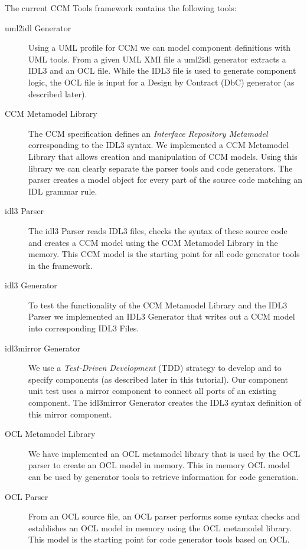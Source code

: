 The current CCM Tools framework contains the following tools:
\begin{description}
\item [uml2idl Generator]
Using a UML profile for CCM \cite{} we can model component definitions with
UML tools. From a given UML XMI file a uml2idl generator extracts a IDL3 
and an OCL file. 
While the IDL3 file is used to generate component logic, the OCL file is input
for a Design by Contract (DbC) generator (as described later).

\item [CCM Metamodel Library]
The CCM specification defines an {\it Interface Repository Metamodel} corresponding
to the IDL3 syntax. We implemented a CCM Metamodel Library that allows creation and
manipulation of CCM models. Using this library we can clearly separate the parser
tools and code generators. The parser creates a model object for every part of the
source code matching an IDL grammar rule.

\item [idl3 Parser]
The idl3 Parser reads IDL3 files, checks the syntax of these source code
and creates a CCM model using the CCM Metamodel Library in the memory. This CCM
model is the starting point for all code generator tools in the framework.

\item [idl3 Generator]
To test the functionality of the CCM Metamodel Library and the IDL3 Parser we implemented
an IDL3 Generator that writes out a CCM model into corresponding IDL3 Files.

\item [idl3mirror Generator]
We use a {\it Test-Driven Development} (TDD) strategy to develop and to specify
components (as described later in this tutorial). Our component unit test uses a
mirror component to connect all ports of an existing component. The idl3mirror
Generator creates the IDL3 syntax definition of this mirror component.


\item [OCL Metamodel Library]
We have implemented an OCL metamodel library that is used by the OCL parser
to create an OCL model in memory.
This in memory OCL model can be used by generator tools to retrieve
information for code generation.

\item [OCL Parser]
From an OCL source file, an OCL parser performs some syntax checks and
establishes an OCL model in memory using the OCL metamodel library. 
This model is the starting point for code generator tools based on OCL. 


\end{description}
